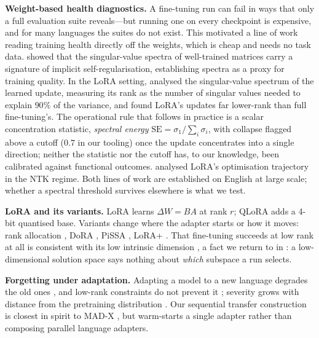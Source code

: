 \documentclass[11pt]{article}
\begin{document}
\textbf{Weight-based health diagnostics.} A fine-tuning run can fail in ways that only a full evaluation suite reveals---but running one on every checkpoint is expensive, and for many languages the suites do not exist. This motivated a line of work reading training health directly off the weights, which is cheap and needs no task data. \citet{martin2021implicit} showed that the singular-value spectra of well-trained matrices carry a signature of implicit self-regularisation, establishing spectra as a proxy for training quality. In the LoRA setting, \citet{biderman2024lora} analysed the singular-value spectrum of the learned update, measuring its rank as the number of singular values needed to explain $90\%$ of the variance, and found LoRA's updates far lower-rank than full fine-tuning's. The operational rule that follows in practice is a scalar concentration statistic, \emph{spectral energy} $\text{SE} = \sigma_1/\sum_i \sigma_i$, with collapse flagged above a cutoff ($0.7$ in our tooling) once the update concentrates into a single direction; neither the statistic nor the cutoff has, to our knowledge, been calibrated against functional outcomes. \citet{jang2024lora} analysed LoRA's optimisation trajectory in the NTK regime. Both lines of work are established on English at large scale; whether a spectral threshold survives elsewhere is what we test.

\textbf{LoRA and its variants.} LoRA \cite{hu2022lora} learns $\Delta W = BA$ at rank $r$; QLoRA \cite{dettmers2023qlora} adds a 4-bit quantised base. Variants change where the adapter starts or how it moves: rank allocation \cite{zhang2023adalora}, DoRA \citep{liu2024dora}, PiSSA \citep{meng2024pissa}, LoRA+ \citep{hayou2024loraplus}. That fine-tuning succeeds at low rank at all is consistent with its low intrinsic dimension \cite{aghajanyan2021intrinsic}, a fact we return to in : a low-dimensional solution space says nothing about \emph{which} subspace a run selects.

\textbf{Forgetting under adaptation.} Adapting a model to a new language degrades the old ones \cite{mccloskey1989catastrophic,kirkpatrick2017overcoming}, and low-rank constraints do not prevent it \cite{luo2023forget,kotha2024understanding,kumar2022finetuning}; severity grows with distance from the pretraining distribution \cite{csaki2024sambalingo}. Our sequential transfer construction is closest in spirit to MAD-X \cite{pfeiffer2020madx}, but warm-starts a single adapter rather than composing parallel language adapters.
\end{document}

